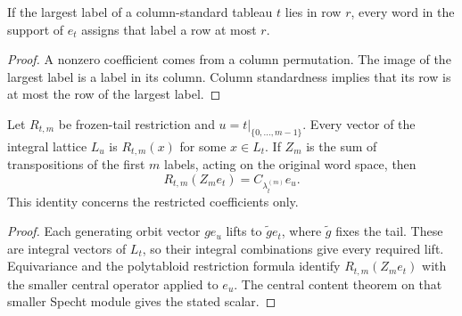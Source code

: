 \begin{lemma}
\label{lem:polytabloid-last-support}
\leanok
If the largest label of a column-standard tableau $t$ lies in row
$r$, every word in the support of $e_t$ assigns that label a row
at most $r$.
\end{lemma}
\begin{proof}
A nonzero coefficient comes from a column permutation. The image of
the largest label is a label in its column. Column standardness
implies that its row is at most the row of the largest label.
\end{proof}

\begin{lemma}
\label{lem:prefix-slice-central}
\leanok
Let $R_{t,m}$ be frozen-tail restriction and $u=t|_{\{0,\ldots,m-1\}}$.
Every vector of the integral lattice $L_u$ is $R_{t,m}(x)$ for some
$x\in L_t$. If $Z_m$ is the sum of transpositions of the first $m$
labels, acting on the original word space, then
\[
 R_{t,m}(Z_m e_t)=C_{\lambda_t^{(m)}}e_u.
\]
This identity concerns the restricted coefficients only.
\end{lemma}
\begin{proof}
Each generating orbit vector $g e_u$ lifts to $\widetilde g e_t$,
where $\widetilde g$ fixes the tail. These are integral vectors of
$L_t$, so their integral combinations give every required lift.
Equivariance and the polytabloid restriction formula identify
$R_{t,m}(Z_m e_t)$ with the smaller central operator applied to $e_u$.
The central content theorem on that smaller Specht module gives the
stated scalar.
\end{proof}

